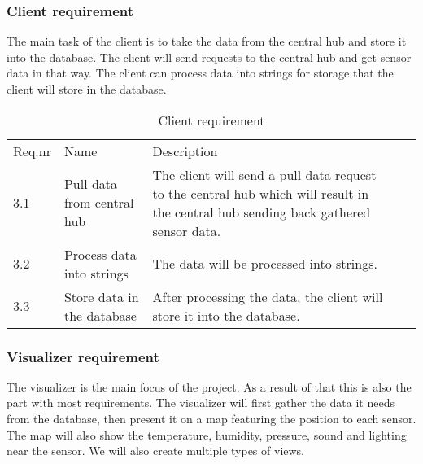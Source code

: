 \documentclass[../document]{subfiles}
\begin{document}
\subsubsection{Client requirement}
The main task of the client is to take the data from the central hub and store it into the database. The client will send requests to the central hub and get sensor data in that way. The client can process data into strings for storage that the client will store in the database.

\begin{table}[H]
\caption{Client requirement}
\centering
\begin{tabularx}{\textwidth}{|l|X|X|l|X|}
\hline
\\ \hline Req.nr
&Name
&Description
\\ \hline3.1
&Pull data from central hub
&The client will send a pull data request to the central hub which will result in the central hub sending back gathered sensor data.
\\ \hline3.2
&Process data into strings
&The data will be processed into strings.
\\ \hline3.3
&Store data in the database
&After processing the data, the client will store it into the database.
\\ \hline 
\end{tabularx}
\end{table}

\subsubsection{Visualizer requirement}
The visualizer is the main focus of the project. As a result of that this is also the part with most requirements. The visualizer will first gather the data it needs from the database, then present it on a map featuring the position to each sensor. The map will also show the temperature, humidity, pressure, sound and lighting near the sensor. We will also create multiple types of views.
\end{document}

